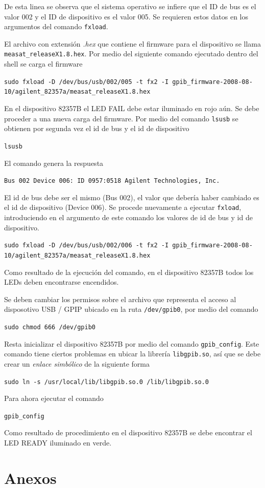 \documentclass[paper=letter,oneside,fontsize=11pt, parskip=full]{scrartcl}
\begin{document}
		De esta linea se observa que el sistema operativo se infiere que el ID de bus es el valor 002 y el ID de dispositivo es el valor 005. Se requieren estos datos en los argumentos del comando \texttt{fxload}.
		
		El archivo con extensión \emph{.hex} que contiene el firmware para el dispositivo se llama \texttt{measat\_releaseX1.8.hex}. Por medio del siguiente comando ejecutado dentro del shell se carga el firmware
		
		\texttt{sudo fxload -D /dev/bus/usb/002/005  -t fx2 -I gpib\_firmware-2008-08-10/agilent\_82357a/measat\_releaseX1.8.hex}
		
		En el dispositivo 82357B el LED FAIL debe estar iluminado en rojo aún. Se debe proceder a una nueva carga del firmware. Por medio del comando \texttt{lsusb} se obtienen por segunda vez el id de bus y el id de dispositivo
		
		\texttt{lsusb}
		
		El comando genera la respuesta
		
		\texttt{Bus 002 Device 006: ID 0957:0518 Agilent Technologies, Inc.}
		
		El id de bus debe ser el mismo (Bus 002), el valor que debería haber cambiado es el id de dispositivo (Device 006). Se procede nuevamente a ejecutar \texttt{fxload}, introduciendo en el argumento de este comando los valores de id de bus y id de dispositivo.
		
		\texttt{sudo fxload -D /dev/bus/usb/002/006  -t fx2 -I gpib\_firmware-2008-08-10/agilent\_82357a/measat\_releaseX1.8.hex}
		
		
		Como resultado de la ejecución del comando, en el dispositivo 82357B todos los LEDs deben encontrarse encendidos.		
		
		Se deben cambiar los permisos sobre el archivo que representa el acceso al disposotivo USB / GPIP ubicado en la ruta \texttt{/dev/gpib0}, por medio del comando
		
		\texttt{sudo chmod 666 /dev/gpib0}
		
		Resta inicializar el dispositivo 82357B por medio del comando \texttt{gpib\_config}. Este comando tiene ciertos problemas en ubicar la librería \texttt{libgpib.so}, así que se debe crear un \emph{enlace simbólico} de la siguiente forma
		
		\texttt{sudo ln -s /usr/local/lib/libgpib.so.0 /lib/libgpib.so.0}
		
		Para ahora ejecutar el comando
			
		\begin{ttfamily}
			\texttt{gpib\_config}
		\end{ttfamily}

	
		Como resultado de procedimiento en el dispositivo 82357B se debe encontrar el LED READY iluminado en verde.
	
	\section{Anexos}	
		
\end{document}
